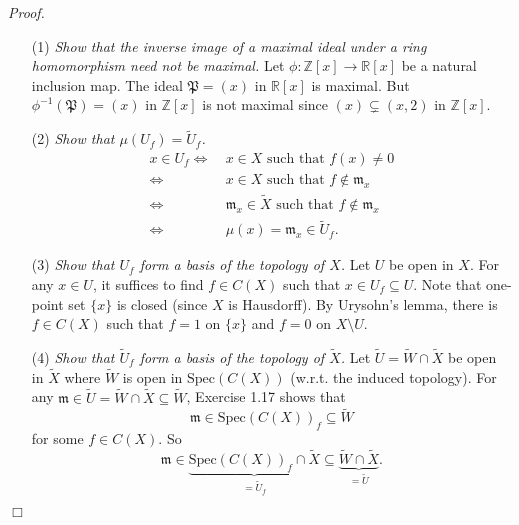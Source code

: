 \documentclass{article}
\begin{document}
\emph{Proof.}
\begin{enumerate}
\item[(1)]
  \emph{Show that the inverse image of a maximal ideal under a ring homomorphism need not be maximal.}
  Let $\phi: \mathbb{Z}[x] \to \mathbb{R}[x]$ be a natural inclusion map.
  The ideal $\mathfrak{P} = (x)$ in $\mathbb{R}[x]$ is maximal.
  But $\phi^{-1}(\mathfrak{P}) = (x)$ in $\mathbb{Z}[x]$ is not maximal
  since $(x) \subsetneq (x,2)$ in $\mathbb{Z}[x]$.

\item[(2)]
  \emph{Show that $\mu(U_f) = \widetilde{U}_f$.}
  \begin{align*}
    x \in U_f
    \Longleftrightarrow & \:
    x \in X \text{ such that } f(x) \neq 0 \\
    \Longleftrightarrow & \:
    x \in X \text{ such that } f \not\in \mathfrak{m}_x \\
    \Longleftrightarrow & \:
    \mathfrak{m}_x \in \widetilde{X} \text{ such that } f \not\in \mathfrak{m}_x \\
    \Longleftrightarrow & \:
    \mu(x) = \mathfrak{m}_x \in \widetilde{U}_f.
  \end{align*}

\item[(3)]
  \emph{Show that $U_f$ form a basis of the topology of $X$.}
  Let $U$ be open in $X$.
  For any $x \in U$, it suffices to find $f \in C(X)$ such that $x \in U_f \subseteq U$.
  Note that one-point set $\{x\}$ is closed (since $X$ is Hausdorff).
  By Urysohn's lemma,
  there is $f \in C(X)$ such that $f = 1$ on $\{x\}$ and $f = 0$ on $X \setminus U$.

\item[(4)]
  \emph{Show that $\widetilde{U}_f$ form a basis of the topology of $\widetilde{X}$.}
  Let $\widetilde{U} = \widetilde{W} \cap \widetilde{X}$ be open in $\widetilde{X}$
  where $\widetilde{W}$ is open in $\mathrm{Spec}(C(X))$ (w.r.t. the induced topology).
  For any $\mathfrak{m} \in \widetilde{U} = \widetilde{W} \cap \widetilde{X} \subseteq \widetilde{W}$,
  Exercise 1.17 shows that
  \[
    \mathfrak{m} \in \mathrm{Spec}(C(X))_{f} \subseteq \widetilde{W}
  \]
  for some $f \in C(X)$.
  So
  \[
    \mathfrak{m} \in
    \underbrace{\mathrm{Spec}(C(X))_{f} \cap \widetilde{X}}_{= \widetilde{U}_f}
    \subseteq
    \underbrace{\widetilde{W} \cap \widetilde{X}}_{= \widetilde{U}}.
  \]
\end{enumerate}
$\Box$ \\\\
\end{document}
